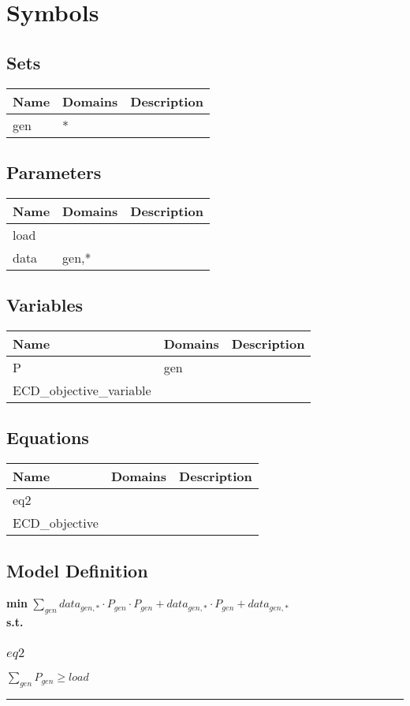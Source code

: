 \documentclass[11pt]{article}
\begin{document}
\section*{Symbols}


\subsection*{Sets}
\begin{tabularx}{\textwidth}{| l | l | X |}
\hline
\textbf{Name} & \textbf{Domains} & \textbf{Description}\\
\hline
\endhead

gen & * & \\
\hline
\end{tabularx}
\subsection*{Parameters}
\begin{tabularx}{\textwidth}{| l | l | X |}
\hline
\textbf{Name} & \textbf{Domains} & \textbf{Description}\\
\hline
\endhead

load &  & \\
data & gen,* & \\
\hline
\end{tabularx}
\subsection*{Variables}
\begin{tabularx}{\textwidth}{| l | l | X |}
\hline
\textbf{Name} & \textbf{Domains} & \textbf{Description}\\
\hline
\endhead

P & gen & \\
ECD\_objective\_variable &  & \\
\hline
\end{tabularx}
\subsection*{Equations}
\begin{tabularx}{\textwidth}{| l | l | X |}
\hline
\textbf{Name} & \textbf{Domains} & \textbf{Description}\\
\hline
\endhead

eq2 &  & \\
ECD\_objective &  & \\
\hline
\end{tabularx}
\subsection*{Model Definition}
\textbf{min} $\sum_{gen} data_{gen,*} \cdot P_{gen} \cdot P_{gen} + data_{gen,*} \cdot P_{gen} + data_{gen,*}$\\
\textbf{s.t.}
\subsubsection*{$eq2$}
$
\sum_{gen} P_{gen} \geq load
$
\vspace{5pt}
\hrule
\bigskip
\end{document}
